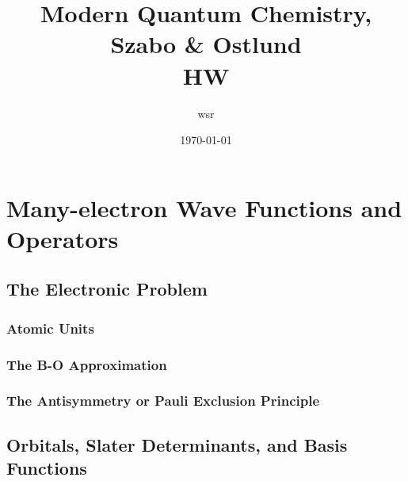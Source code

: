 \documentclass[a4paper]{article}
\title{\textbf{Modern Quantum Chemistry, Szabo \& Ostlund}\\HW}
\author{wsr
\vspace{5pt}\\
}
\date{\today} %
\begin{document}

\maketitle

\tableofcontents

\newpage

\setcounter{section}{1}
\section{Many-electron Wave Functions and Operators}
\subsection{The Electronic Problem}
\subsubsection{Atomic Units}
\subsubsection{The B-O Approximation}
\subsubsection{The Antisymmetry or Pauli Exclusion Principle}
\subsection{Orbitals, Slater Determinants, and Basis Functions}
\end{document}
